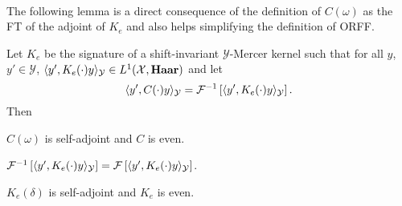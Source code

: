 \paragraph{}
The following lemma is a direct consequence of the definition of $C(\omega)$ as
the \acl{FT} of the adjoint of $K_e$ and also helps simplifying the definition
of \acs{ORFF}.
\begin{lemma}
    \label{lm:C_characterization}
    Let $K_e$ be the signature of a shift-invariant $\mathcal{Y}$-Mercer kernel
    such that for all $y$, $y'\in\mathcal{Y}$, $\langle y',
    K_e(\cdot)y\rangle_{\mathcal{Y}}\in L^1(\mathcal{X},\mathbf{Haar})$ and let
    \begin{dmath*}
        \inner{y', C(\cdot)y}_{\mathcal{Y}}=\IFT{\inner{y',
        K_e(\cdot)y}_{\mathcal{Y}}}.
    \end{dmath*}
    Then
    \begin{propenum}
        \item \label{lm:C_characterization_1} $C(\omega)$ is self-adjoint and
        $C$ is even.
        \item \label{lm:C_characterization_2} $\mathcal{F}^{-1}\left[\langle y',
        K_e(\cdot)y\rangle_{\mathcal{Y}}\right] = \mathcal{F}\left[\langle y',
        K_e(\cdot)y\rangle_{\mathcal{Y}}\right]$.
        \item \label{lm:C_characterization_3} $K_e(\delta)$ is self-adjoint and
        $K_e$ is even.
    \end{propenum}
\end{lemma}
